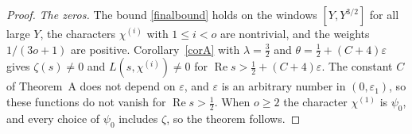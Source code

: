 \begin{proof}
\emph{The zeros.} The bound \eqref{finalbound} holds on the windows $[Y,Y^{3/2}]$ for all large $Y$, the characters $\chi^{(i)}$ with $1\le i<o$ are nontrivial, and the weights $1/(3o+1)$ are positive. Corollary~\ref{corA} with $\lambda=\frac32$ and $\theta=\frac12+(C+4)\varepsilon$ gives $\zeta(s)\ne0$ and $L(s,\chi^{(i)})\ne0$ for $\operatorname{Re}s>\frac12+(C+4)\varepsilon$. The constant $C$ of Theorem~A does not depend on $\varepsilon$, and $\varepsilon$ is an arbitrary number in $(0,\varepsilon_1)$, so these functions do not vanish for $\operatorname{Re}s>\frac12$.
When $o\ge2$ the character $\chi^{(1)}$ is $\psi_0$, and every choice of $\psi_0$ includes $\zeta$, so the theorem follows.
\end{proof}
